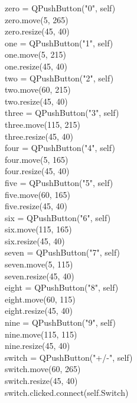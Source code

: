 zero = QPushButton("0", self)\\
        zero.move(5, 265)\\
        zero.resize(45, 40)\\

        one = QPushButton("1", self)\\
        one.move(5, 215)\\
        one.resize(45, 40)\\

        two = QPushButton("2", self)\\
        two.move(60, 215)\\
        two.resize(45, 40)\\

three = QPushButton("3", self)\\
        three.move(115, 215)\\
        three.resize(45, 40)\\

        four = QPushButton("4", self)\\
        four.move(5, 165)\\
        four.resize(45, 40)\\

        five = QPushButton("5", self)\\
        five.move(60, 165)\\
        five.resize(45, 40)\\

        six = QPushButton("6", self)\\
        six.move(115, 165)\\
        six.resize(45, 40)\\

seven = QPushButton("7", self)\\
        seven.move(5, 115)\\
        seven.resize(45, 40)\\

        eight = QPushButton("8", self)\\
        eight.move(60, 115)\\
        eight.resize(45, 40)\\

        nine = QPushButton("9", self)\\
        nine.move(115, 115)\\
        nine.resize(45, 40)\\

        switch = QPushButton("+/-", self)\\
        switch.move(60, 265)\\
        switch.resize(45, 40)\\
        switch.clicked.connect(self.Switch)\\

